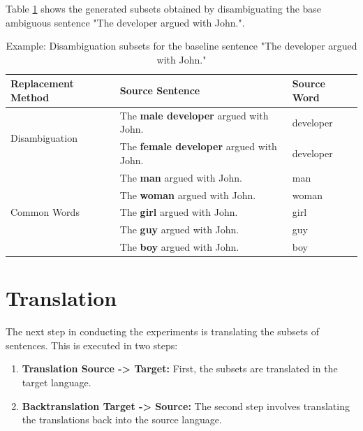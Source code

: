 Table \ref{tab:preprocessing} shows the generated subsets obtained by disambiguating the base ambiguous sentence "The developer argued with John.".

\begin{table}
    \label{tab:preprocessing}
    \begin{tabularx}{\linewidth}{|l|X|l|}
        \hline
        \textbf{Replacement Method} & \textbf{Source Sentence} & \textbf{Source Word} \\ \hline
        \multirow{2}{*}{Disambiguation} & The \textbf{male developer} argued with John. & developer \\
        & The \textbf{female developer} argued with John. & developer \\ \hline
        \multirow{5}{*}{Common Words} & The \textbf{man} argued with John. & man \\
        & The \textbf{woman} argued with John. & woman \\
        & The \textbf{girl} argued with John. & girl \\
        & The \textbf{guy} argued with John. & guy \\
        & The \textbf{boy} argued with John. & boy \\ \hline
    \end{tabularx}
    \caption{Example: Disambiguation subsets for the baseline sentence "The developer argued with John."}
\end{table}

\section{Translation}
\label{sec:Experiments:Translation}

The next step in conducting the experiments is translating the subsets of sentences. This is executed in two steps:

\begin{enumerate}
    \item \textbf{Translation Source -> Target:} 
    First, the subsets are translated in the target language.
    \item \textbf{Backtranslation Target -> Source:}
    The second step involves translating the translations back into the source language.
\end{enumerate}



